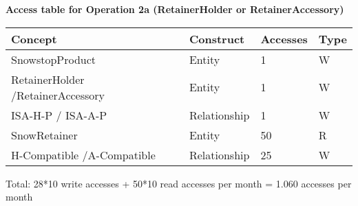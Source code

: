 \vspace{12px}

{\centering \textbf{Access table for Operation 2a (RetainerHolder or RetainerAccessory)}\\}
\begin{table}[H]
  \def\arraystretch{1.10}%
  \centering
  \begin{tabular}{ | m{4cm} | m{4cm}| m{3cm} | m{2cm} |}
    \hline
    {\textbf{\large Concept}} & {\textbf{\large Construct}} & {\textbf{\large Accesses}} & {\textbf{\large Type}} \\
    \hline
    \color[HTML]{3531FF} SnowstopProduct & Entity & 1 & W \\
    \hline
    \color[HTML]{3531FF} RetainerHolder /\newline RetainerAccessory & Entity & 1 & W \\
    \hline
    \color[HTML]{3531FF} ISA-H-P / ISA-A-P & Relationship & 1 & W \\
    \hline
    \color[HTML]{3531FF} SnowRetainer & Entity & 50 & R \\
    \hline
    \color[HTML]{3531FF} H-Compatible /\newline A-Compatible & Relationship & 25 & W \\
    \hline
  \end{tabular}
\end{table}
Total: 28*10 write accesses + 50*10 read accesses per month = 1.060 accesses per month

\vspace{12px}

